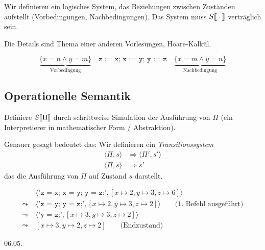 Wir definieren ein logisches System, das Beziehungen zwischen Zuständen aufstellt (Vorbedingungen, Nachbedingungen). Das System muss $S\mathrm{[}\kern-.14em\mathrm{[}\cdot\mathrm{]}\kern-.14em\mathrm{]}$ verträglich sein.

Die Details sind Thema einer anderen Vorlesungen, \zb{} Hoare-Kalkül.

\begin{example}
    \[
    \underbrace{\{ x = n \wedge y = m \}}_{\text{Vorbedingung}} \quad \texttt{z := x; x := y; y := z} \quad \underbrace{\{ x = m \wedge y = n \}}_{\text{Nachbedingung}}
    \]
\end{example}



\subsection{Operationelle Semantik}

Definiere $S\mathrm{[}\kern-.14em\mathrm{[}\Pi\mathrm{]}\kern-.14em\mathrm{]}$ durch schrittweise Simulation der Ausführung von $\Pi$ (ein Interpretierer in mathematischer Form / Abstraktion).

Genauer gesagt bedeutet das: Wir definieren ein \emph{Transitionssystem}
\begin{align*}
    \langle \Pi, s \rangle & \Rightarrow \langle \Pi', s' \rangle \\
    \langle \Pi, s \rangle & \Rightarrow s'
\end{align*}
das die Ausführung von $\Pi$ auf Zustand $s$ darstellt.

\begin{example}
    \begin{align*}
        & \langle \texttt{'z = x; x = y; y = z;'}, [x \mapsto 2, y \mapsto 3, z \mapsto 6] \rangle \\
        \leadsto \; & \langle \texttt{'x = y; y = z;'}, [x \mapsto 2, y \mapsto 3, z \mapsto 2] \rangle \quad\quad \text{(1. Befehl ausgeführt)} \\
        \leadsto \; & \langle \texttt{'y = z;'}, [x \mapsto 3, y \mapsto 3, z \mapsto 2] \rangle \\
        \leadsto \; & [x \mapsto 3, y \mapsto 2, z \mapsto 2] \quad\quad \text{(Endzustand)}
    \end{align*}
\end{example}



\newpage
\hfill 06.05.


